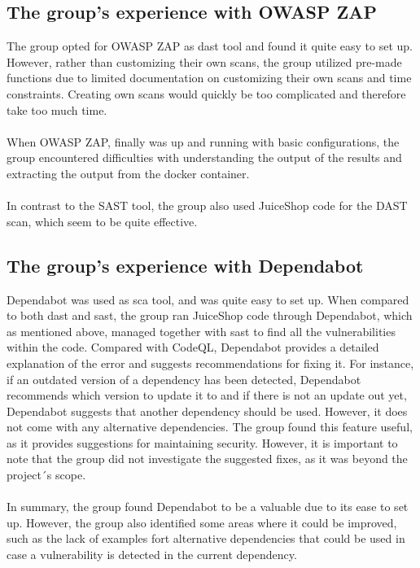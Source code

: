 \subsection{The group's experience with OWASP ZAP}

The group opted for OWASP ZAP as \acrshort{dast} tool and found it quite easy to set up. However, rather than customizing their own scans, the group utilized pre-made functions due to limited documentation on customizing their own scans and time constraints. Creating own scans would quickly be too complicated and therefore take too much time. 
\\~\\
When OWASP ZAP, finally was up and running with basic configurations, the group encountered difficulties with understanding the output of the results and extracting the output from the docker container. 
\\~\\
In contrast to the SAST tool, the group also used JuiceShop code for the  DAST scan, which seem to be quite effective. 



\subsection{The group's experience with Dependabot}
Dependabot was used as \acrshort{sca} tool, and was quite easy to set up. When compared to both \acrshort{dast} and \acrshort{sast}, the group ran JuiceShop code through Dependabot, which as mentioned above, managed together with \acrshort{sast} to find all the vulnerabilities within the code. 
Compared with CodeQL, Dependabot provides a detailed explanation of the error and suggests recommendations for fixing it. For instance, if an outdated version of a dependency has been detected, Dependabot recommends which version to update it to and if there is not an update out yet, Dependabot suggests that another dependency should be used. However, it does not come with any alternative dependencies. The group found this feature useful, as it provides suggestions for maintaining security. However, it is important to note that the group did not investigate the suggested fixes, as it was beyond the project´s scope.
\\~\\
In summary, the group found Dependabot to be a valuable due to its ease to set up. However, the group also identified some areas where it could be improved, such as the lack of examples fort alternative dependencies that could be used in case a vulnerability is detected in the current dependency. 


